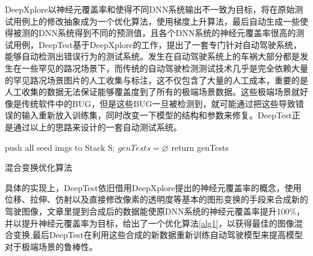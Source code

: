 DeepXplore以神经元覆盖率和使得不同DNN系统输出不一致为目标，将在原始测试用例上的修改抽象成为一个优化算法，使用梯度上升算法，最后自动生成一些使得被测的DNN系统得到不同的预测值，且各个DNN系统的神经元覆盖率很高的测试用例，DeepTest基于DeepXplore的工作，提出了一套专门针对自动驾驶系统，能够自动检测出错误行为的测试系统。发生在自动驾驶系统上的车祸大部分都是发生在一些罕见的路况场景下，而传统的自动驾驶检测测试技术几乎是完全依赖大量的罕见路况场景图片的人工收集与标注，这不仅包含了大量的人工成本，重要的是人工收集的数据无法保证能够覆盖度到了所有的极端场景数据。这些极端场景就好像是传统软件中的BUG，但是这些BUG一旦被检测到，就可能通过把这些导致错误的输入重新放入训练集，同时改变一下模型的结构和参数来修复。DeepTest正是通过以上的思路来设计的一套自动测试系统。

\begin{algorithm}[h]
    \small
    \SetAlgoLined


    push all seed imgs to Stack S;\;
    $genTests = \varnothing$\;
    return genTests
    \caption{混合变换优化算法\cite{DeepTest}}
    \label{alg1}
\end{algorithm}

具体的实现上，DeepTest依旧借用DeepXplore提出的神经元覆盖率的概念，使用位移、拉伸、仿射以及直接修改像素的透明度等基本的图形变换的手段来合成新的驾驶图像，文章里提到合成后的数据能使原DNN系统的神经元覆盖率提升100\%\cite{DeepTest}，并以提升神经元覆盖率为目标，给出了一个优化算法\ref{alg1}，以获得最佳的图像混合变换,最后DeepTest在利用这些合成的新数据重新训练自动驾驶模型来提高模型对于极端场景的鲁棒性。

